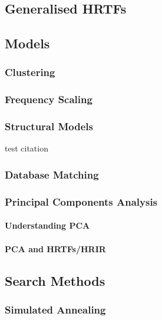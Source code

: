 \subsection{Generalised HRTFs}


\subsection{Models}

\subsubsection{Clustering}

\subsubsection{Frequency Scaling}

\subsubsection{Structural Models}
test citation \citep{Holzl2012a} 
\subsubsection{Database Matching}

\subsubsection{Principal Components Analysis}

\paragraph{Understanding PCA}

\paragraph{PCA and HRTFs/HRIR}

\subsection{Search Methods}

\subsubsection{Simulated Annealing}